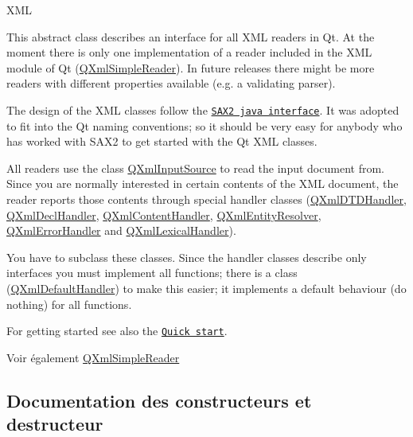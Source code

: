 X\+M\+L

This abstract class describes an interface for all X\+M\+L readers in Qt. At the moment there is only one implementation of a reader included in the X\+M\+L module of Qt (\hyperlink{class_q_xml_simple_reader}{Q\+Xml\+Simple\+Reader}). In future releases there might be more readers with different properties available (e.\+g. a validating parser).

The design of the X\+M\+L classes follow the \href{http://www.megginson.com/SAX/}{\tt S\+A\+X2 java interface}. It was adopted to fit into the Qt naming conventions; so it should be very easy for anybody who has worked with S\+A\+X2 to get started with the Qt X\+M\+L classes.

All readers use the class \hyperlink{class_q_xml_input_source}{Q\+Xml\+Input\+Source} to read the input document from. Since you are normally interested in certain contents of the X\+M\+L document, the reader reports those contents through special handler classes (\hyperlink{class_q_xml_d_t_d_handler}{Q\+Xml\+D\+T\+D\+Handler}, \hyperlink{class_q_xml_decl_handler}{Q\+Xml\+Decl\+Handler}, \hyperlink{class_q_xml_content_handler}{Q\+Xml\+Content\+Handler}, \hyperlink{class_q_xml_entity_resolver}{Q\+Xml\+Entity\+Resolver}, \hyperlink{class_q_xml_error_handler}{Q\+Xml\+Error\+Handler} and \hyperlink{class_q_xml_lexical_handler}{Q\+Xml\+Lexical\+Handler}).

You have to subclass these classes. Since the handler classes describe only interfaces you must implement all functions; there is a class (\hyperlink{class_q_xml_default_handler}{Q\+Xml\+Default\+Handler}) to make this easier; it implements a default behaviour (do nothing) for all functions.

For getting started see also the \href{xml-sax.html#quickStart}{\tt Quick start}.

\begin{DoxySeeAlso}{Voir également}
\hyperlink{class_q_xml_simple_reader}{Q\+Xml\+Simple\+Reader} 
\end{DoxySeeAlso}


\subsection{Documentation des constructeurs et destructeur}
\hypertarget{class_q_xml_reader_a502c745f895f662b77e0699b169dddec}{}
